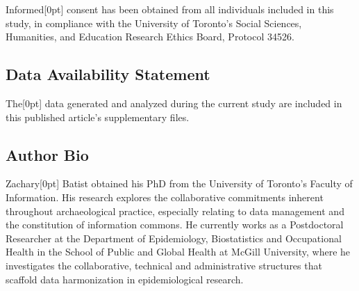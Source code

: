 \documentclass[
]{article}
\newcommand{\paragraphnumber}[1]{\marginnote{\color{lightgray}\tiny{#1}}[0pt]}
\begin{document}
Informed\paragraphnumber{[129]} consent has been obtained from all
individuals included in this study, in compliance with the University of
Toronto's Social Sciences, Humanities, and Education Research Ethics
Board, Protocol 34526.

\subsection{Data Availability
Statement}\label{data-availability-statement}

The\paragraphnumber{[130]} data generated and analyzed during the
current study are included in this published article's supplementary
files.

\subsection{Author Bio}\label{author-bio}

Zachary\paragraphnumber{[131]} Batist obtained his PhD from the
University of Toronto's Faculty of Information. His research explores
the collaborative commitments inherent throughout archaeological
practice, especially relating to data management and the constitution of
information commons. He currently works as a Postdoctoral Researcher at
the Department of Epidemiology, Biostatistics and Occupational Health in
the School of Public and Global Health at McGill University, where he
investigates the collaborative, technical and administrative structures
that scaffold data harmonization in epidemiological research.
\end{document}
